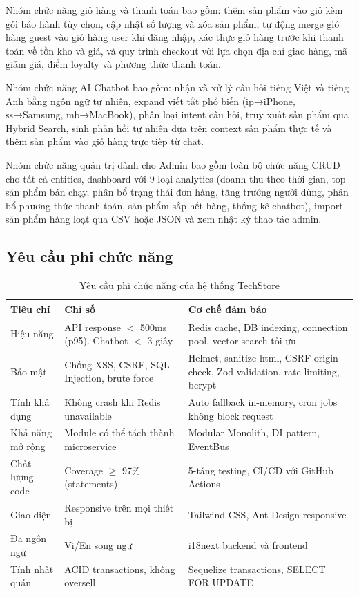 Nhóm chức năng giỏ hàng và thanh toán bao gồm: thêm sản phẩm vào giỏ kèm gói bảo hành tùy chọn, cập nhật số lượng và xóa sản phẩm, tự động merge giỏ hàng guest vào giỏ hàng user khi đăng nhập, xác thực giỏ hàng trước khi thanh toán về tồn kho và giá, và quy trình checkout với lựa chọn địa chỉ giao hàng, mã giảm giá, điểm loyalty và phương thức thanh toán.

Nhóm chức năng AI Chatbot bao gồm: nhận và xử lý câu hỏi tiếng Việt và tiếng Anh bằng ngôn ngữ tự nhiên, expand viết tắt phổ biến (ip→iPhone, ss→Samsung, mb→MacBook), phân loại intent câu hỏi, truy xuất sản phẩm qua Hybrid Search, sinh phản hồi tự nhiên dựa trên context sản phẩm thực tế và thêm sản phẩm vào giỏ hàng trực tiếp từ chat.

Nhóm chức năng quản trị dành cho Admin bao gồm toàn bộ chức năng CRUD cho tất cả entities, dashboard với 9 loại analytics (doanh thu theo thời gian, top sản phẩm bán chạy, phân bổ trạng thái đơn hàng, tăng trưởng người dùng, phân bổ phương thức thanh toán, sản phẩm sắp hết hàng, thống kê chatbot), import sản phẩm hàng loạt qua CSV hoặc JSON và xem nhật ký thao tác admin.

\subsection{Yêu cầu phi chức năng}

\begin{table}[H]
\centering
\caption{Yêu cầu phi chức năng của hệ thống TechStore}
\begin{tabular}{|p{2.5cm}|p{3.5cm}|p{7cm}|}
\hline
\textbf{Tiêu chí} & \textbf{Chỉ số} & \textbf{Cơ chế đảm bảo} \\
\hline
Hiệu năng & API response $<$ 500ms (p95). Chatbot $<$ 3 giây & Redis cache, DB indexing, connection pool, vector search tối ưu \\
\hline
Bảo mật & Chống XSS, CSRF, SQL Injection, brute force & Helmet, sanitize-html, CSRF origin check, Zod validation, rate limiting, bcrypt \\
\hline
Tính khả dụng & Không crash khi Redis unavailable & Auto fallback in-memory, cron jobs không block request \\
\hline
Khả năng mở rộng & Module có thể tách thành microservice & Modular Monolith, DI pattern, EventBus \\
\hline
Chất lượng code & Coverage $\geq$ 97\% (statements) & 5-tầng testing, CI/CD với GitHub Actions \\
\hline
Giao diện & Responsive trên mọi thiết bị & Tailwind CSS, Ant Design responsive \\
\hline
Đa ngôn ngữ & Vi/En song ngữ & i18next backend và frontend \\
\hline
Tính nhất quán & ACID transactions, không oversell & Sequelize transactions, SELECT FOR UPDATE \\
\hline
\end{tabular}
\end{table}

